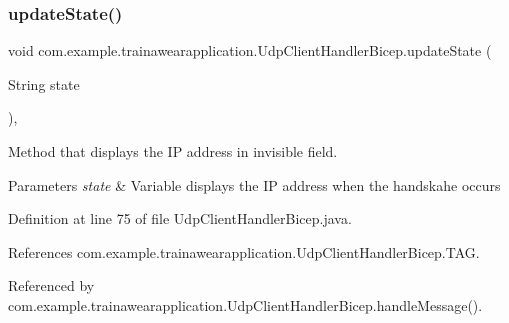 \mbox{\label{classcom_1_1example_1_1trainawearapplication_1_1_udp_client_handler_bicep_aaf087b8a72f9ea8baf46baca6dc4cdc1}} 
\subsubsection{\texorpdfstring{updateState()}{updateState()}}
{\footnotesize\ttfamily void com.\+example.\+trainawearapplication.\+Udp\+Client\+Handler\+Bicep.\+update\+State (\begin{DoxyParamCaption}\item[{String}]{state }\end{DoxyParamCaption})\hspace{0.3cm}{\ttfamily [inline]}, {\ttfamily [private]}}



Method that displays the IP address in invisible field. 


\begin{DoxyParams}{Parameters}
{\em state} & Variable displays the IP address when the handskahe occurs \\
\hline
\end{DoxyParams}


Definition at line 75 of file Udp\+Client\+Handler\+Bicep.\+java.


\begin{DoxyCode}{0}

\end{DoxyCode}


References com.\+example.\+trainawearapplication.\+Udp\+Client\+Handler\+Bicep.\+T\+AG.



Referenced by com.\+example.\+trainawearapplication.\+Udp\+Client\+Handler\+Bicep.\+handle\+Message().



